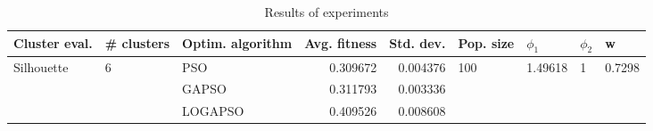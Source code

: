 \begin{table}
\centering
\caption{Results of experiments}
\begin{tabular}{lllrrllll}
\toprule
              Cluster eval. &        \# clusters & Optim. algorithm &  Avg. fitness &  Std. dev. &            Pop. size &               $\phi_{1}$ &         $\phi_{2}$ &                       w \\
\midrule
\multirow{3}{*}{Silhouette} & \multirow{3}{*}{6} &              PSO &      0.309672 &   0.004376 & \multirow{3}{*}{100} & \multirow{3}{*}{1.49618} & \multirow{3}{*}{1} & \multirow{3}{*}{0.7298} \\
                            &                    &            GAPSO &      0.311793 &   0.003336 &                      &                          &                    &                         \\
                            &                    &          LOGAPSO &      0.409526 &   0.008608 &                      &                          &                    &                         \\
\bottomrule
\end{tabular}
\end{table}
